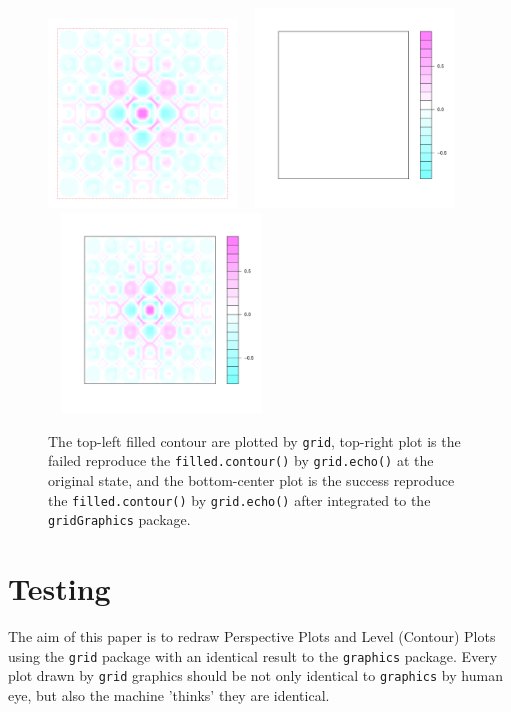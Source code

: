 \documentclass[paper=a4, fontsize=11pt]{report}
\begin{document}
\begin{figure}[h]
	\begin{center}
		\includegraphics[height = 5cm, width = 5cm]{figure/filledContour_origin_02.pdf}
		\includegraphics[height = 5.3cm, width = 6cm]{figure/filledContour_origin_03.pdf}
		\includegraphics[height = 5.3cm, width = 6cm]{figure/filledContour_origin_01.pdf}
		
		\caption{The top-left filled contour are plotted by \texttt{grid}, top-right plot is the failed reproduce the \texttt{filled.contour()} by \texttt{grid.echo()} at the original state, and the bottom-center plot is the success reproduce the \texttt{filled.contour()} by \texttt{grid.echo()} after integrated to the \texttt{gridGraphics} package.}
		\label{figure_4.6}
	\end{center}
\end{figure}


\chapter{Testing}
The aim of this paper is to redraw Perspective Plots and Level (Contour) Plots using the \texttt{grid} package with an identical result to the \texttt{graphics} package. Every plot drawn by \texttt{grid} graphics should be not only identical to \texttt{graphics} by human eye, but also the machine 'thinks' they are identical.\\
\end{document}
